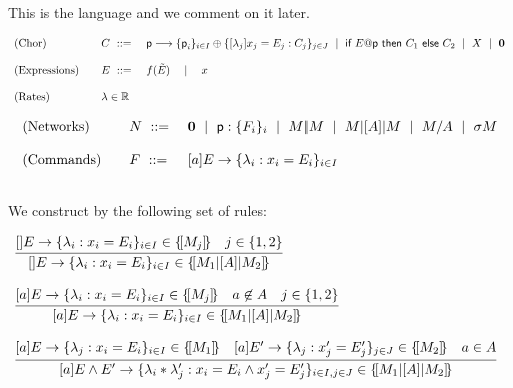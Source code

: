  This is the language and we comment on it later.



\begin{displaymath}
  \begin{array}{lll}
    \text{(Chor)}  \quad & C \ ::=\ & \role p\longrightarrow\{\role p_i\}_{i\in I}\oplus\{[\lambda_j] x_j=E_j: C_j\}_{j\in J}\ \mid\
    \textsf{if } E@\role{p} \textsf{ then } C_1 \textsf{ else } C_2 \ \mid\ X\ \mid\ \CEnd\\\\
    \text{(Expressions)}\quad & E \ ::=\ & f(\tilde E)\quad\mid\quad x\\\\
    \text{(Rates)}\quad       & \lambda\in\mathbb R
  \end{array}
\end{displaymath}


\begin{displaymath}
  \begin{array}{lll}
    \text{(Networks)}  \quad & N \ ::=\ & \CEnd \ \mid\ \role{p}:\{F_i\}_i\ \mid\ M \pp M\ \mid\ M \ppp A M\ \mid\ M/A\ \mid\ \sigma M\\\\
    \text{(Commands)}  \quad & F \ ::=\ & \cmd aE{\lambda_i}{x_i}{E_i}{i\in I}\\\\
  \end{array}
\end{displaymath}

 We construct by the following set of rules:

\begin{displaymath}
  \begin{array}{lll}
    \infer[]
    {\cmd{}E{\lambda_i}{x_i}{E_i}{i\in I}\in \sem{M_1\ppp A M_2}}
    {\cmd{}E{\lambda_i}{x_i}{E_i}{i\in I}\in \sem{M_j}
    & j\in\{1,2\}}
    \\\\
    \infer[]
    {\cmd aE{\lambda_i}{x_i}{E_i}{i\in I}\in \sem{M_1\ppp A M_2}}
    {\cmd aE{\lambda_i}{x_i}{E_i}{i\in I}\in \sem{M_j}
    & a\not\in A    & j\in\{1,2\}}
    \\\\
    \infer[]
    {
    [a] E\land E' \rightarrow \{\lambda_i * \lambda_j': x_i = E_i \land x_j' = E_j' \}_{i\in I, j\in J}
    \in \sem{M_1\ppp A M_2}
    }
    {\cmd aE{\lambda_j}{x_i}{E_i}{i\in I}\in \sem{M_1}{}
    & \cmd a{E'}{\lambda_j}{x_j'}{E_j'}{j\in J}\in \sem{M_2}{}
    & a\in A}
  \end{array}
\end{displaymath}

